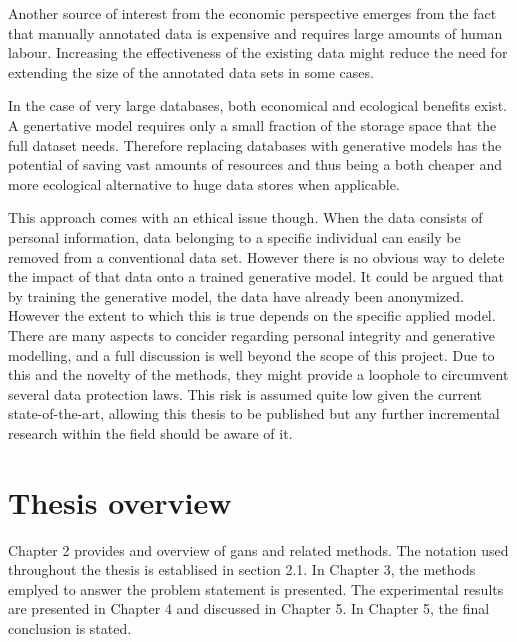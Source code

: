 Another source of interest from the economic perspective emerges from the fact that manually annotated data is expensive and requires large amounts of human labour. Increasing the effectiveness of the existing data might reduce the need for extending the size of the annotated data sets in some cases. 

In the case of very large databases, both economical and ecological benefits exist. A genertative model requires only a small fraction of the storage space that the full dataset needs. Therefore replacing databases with generative models has the potential of saving vast amounts of resources and thus being a both cheaper and more ecological alternative to huge data stores when applicable.  

This approach comes with an ethical issue though. When the data consists of personal information, data belonging to a specific individual can easily be removed from a conventional data set. However there is no obvious way to delete the impact of that data onto a trained generative model. It could be argued that by training the generative model, the data have already been anonymized. However the extent to which this is true depends on the specific applied model. There are many aspects to concider regarding personal integrity and generative modelling, and a full discussion is well beyond the scope of this project. Due to this and the novelty of the methods, they might provide a loophole to circumvent several data protection laws. This risk is assumed quite low given the current state-of-the-art, allowing this thesis to be published but any further incremental research within the field should be aware of it.

\section{Thesis overview}
Chapter 2 provides and overview of \acrlong{gans} and related methods. The notation used throughout the thesis is establised in section 2.1. In Chapter 3, the methods emplyed to answer the problem statement is presented. The experimental results are presented in Chapter 4 and discussed in Chapter 5. In Chapter 5, the final conclusion is stated.



